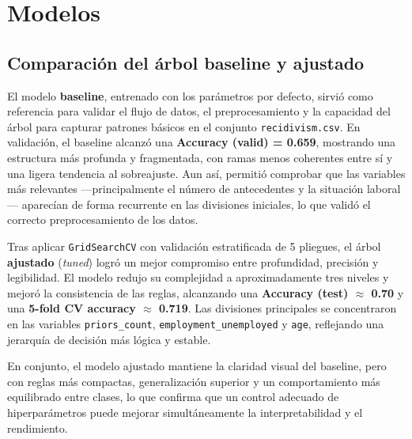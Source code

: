 \section{Modelos}

\subsection{Comparación del árbol baseline y ajustado}

El modelo \textbf{baseline}, entrenado con los parámetros por defecto, sirvió como referencia para validar el flujo de datos, el preprocesamiento y la capacidad del árbol para capturar patrones básicos en el conjunto \texttt{recidivism.csv}. En validación, el baseline alcanzó una \textbf{Accuracy (valid) = 0.659}, mostrando una estructura más profunda y fragmentada, con ramas menos coherentes entre sí y una ligera tendencia al sobreajuste. Aun así, permitió comprobar que las variables más relevantes —principalmente el número de antecedentes y la situación laboral— aparecían de forma recurrente en las divisiones iniciales, lo que validó el correcto preprocesamiento de los datos.

Tras aplicar \texttt{GridSearchCV} con validación estratificada de 5 pliegues, el árbol \textbf{ajustado} (\emph{tuned}) logró un mejor compromiso entre profundidad, precisión y legibilidad. El modelo redujo su complejidad a aproximadamente tres niveles y mejoró la consistencia de las reglas, alcanzando una \textbf{Accuracy (test) $\approx$ 0.70} y una \textbf{5-fold CV accuracy $\approx$ 0.719}. Las divisiones principales se concentraron en las variables \texttt{priors\_count}, \texttt{employment\_unemployed} y \texttt{age}, reflejando una jerarquía de decisión más lógica y estable.

En conjunto, el modelo ajustado mantiene la claridad visual del baseline, pero con reglas más compactas, generalización superior y un comportamiento más equilibrado entre clases, lo que confirma que un control adecuado de hiperparámetros puede mejorar simultáneamente la interpretabilidad y el rendimiento.

